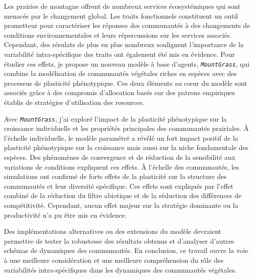 \documentclass[a4paper, notoc, justified,marginals=left, nobib]{tufte-book}
\newcommand{\model}{\textit{\texttt{MountGrass}}}
\begin{document}
\begin{fullwidth}
\indent Les prairies de montagne offrent de nombreux services écosystémiques qui sont menacés par le changement global. Les traits fonctionnels constituent un outil prometteur pour caractériser les réponses des communautés à des changements de conditions environnementales et leurs répercussions sur les services associés. Cependant, des résulats de plus en plus nombreux soulignent l'importance de la variabilité intra-spécifique des traits ont également été mis en évidence. 
Pour étudier ces effets, je propose un nouveau modèle à base d'agents, \model, qui combine la modélisation de communautés végétales riches en espèces avec des processus de plasticité phénotypique. Ces deux éléments au c\oe{}ur du modèle sont associés grâce à des compromis d'allocation basés sur des patrons empiriques établis de stratégies d'utilisation des resources.

Avec \model, j'ai exploré l'impact de la plasticité phénotypique sur la croissance individuelle et les propriétés principales des communautés prairiales. \`A l'échelle individuelle, le modèle paramétré a révélé un fort impact positif de la plasticité phénotypique sur la croissance mais aussi sur la niche fondamentale des espèces. Des phénomènes de convergence et de réduction de la sensibilité aux variations de conditions expliquent ces effets. \`A l'échelle des communautés, les simulations ont confirmé de forts effets de la plasticité sur la structure des communautés et leur diversité spécifique. Ces effets sont expliqués par l'effet combiné de la réduction du filtre abiotique et de la réduction des différences de compétitivité. Cependant, aucun effet majeur sur la stratégie dominante ou la productivité n'a pu être mis en évidence.

Des implémentations alternatives ou des extensions du modèle devraient permettre de tester la robustesse des résultats obtenus et d'analyser d'autres schémas de dynamiques des communautés. En conclusion, ce travail ouvre la voie à une meilleure considération et une meilleure compréhension du rôle des variabilités intra-spécifiques dans les dynamiques des communautés végétales.



\end{fullwidth}
\end{document}
